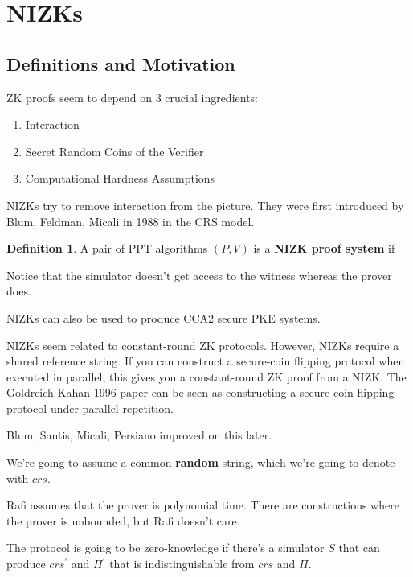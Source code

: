 \documentclass{article}
\theoremstyle{definition}
\newtheorem{definition}{Definition}
\begin{document}
\newpage

\section{NIZKs}

\subsection{Definitions and Motivation}

ZK proofs seem to depend on 3 crucial ingredients:

\begin{enumerate}
    \item Interaction
    \item Secret Random Coins of the Verifier
    \item Computational Hardness Assumptions
\end{enumerate}

NIZKs try to remove interaction from the picture. They were
first introduced by Blum, Feldman, Micali in 1988 in the CRS
model.

\begin{definition}
    A pair of PPT algorithms $(P,V)$ is a \textbf{NIZK proof system} if 
\end{definition}

Notice that the simulator doesn't get access to the witness whereas the
prover does.

NIZKs can also be used to produce CCA2 secure PKE systems.

NIZKs seem related to constant-round ZK protocols.
However, NIZKs require a shared reference string.
If you can construct a secure-coin flipping protocol
when executed in parallel, this gives you a constant-round 
ZK proof from a NIZK. The Goldreich Kahan 1996 paper can be 
seen as constructing a secure coin-flipping protocol 
under parallel repetition.

Blum, Santis, Micali, Persiano improved on this later.

We're going to assume a common \textbf{random} string, which we're
going to denote with $crs$.

Rafi assumes that the prover is polynomial time. There are
constructions where the prover is unbounded, but Rafi doesn't care.

The protocol is going to be zero-knowledge if
there's a simulator $S$ that can produce $crs^{\prime}$
and $\Pi^{\prime}$ that is indistinguishable from 
$crs$ and $\Pi$.
\end{document}
